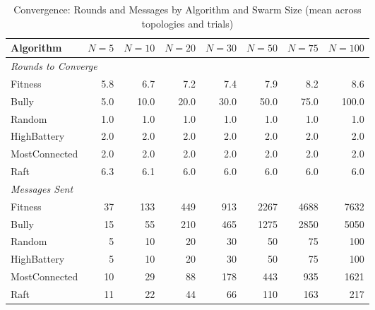 \begin{table}[htbp]
\centering
\caption{Convergence: Rounds and Messages by Algorithm and Swarm Size (mean across topologies and trials)}
\label{tab:convergence}
\begin{tabular}{lrrrrrrr}
\toprule
  Algorithm & $N=5$ & $N=10$ & $N=20$ & $N=30$ & $N=50$ & $N=75$ & $N=100$ \\
\midrule
\multicolumn{8}{l}{\textit{Rounds to Converge}} \\
\midrule
  Fitness & 5.8 & 6.7 & 7.2 & 7.4 & 7.9 & 8.2 & 8.6 \\
  Bully & 5.0 & 10.0 & 20.0 & 30.0 & 50.0 & 75.0 & 100.0 \\
  Random & 1.0 & 1.0 & 1.0 & 1.0 & 1.0 & 1.0 & 1.0 \\
  HighBattery & 2.0 & 2.0 & 2.0 & 2.0 & 2.0 & 2.0 & 2.0 \\
  MostConnected & 2.0 & 2.0 & 2.0 & 2.0 & 2.0 & 2.0 & 2.0 \\
  Raft & 6.3 & 6.1 & 6.0 & 6.0 & 6.0 & 6.0 & 6.0 \\
\midrule
\multicolumn{8}{l}{\textit{Messages Sent}} \\
\midrule
  Fitness & 37 & 133 & 449 & 913 & 2267 & 4688 & 7632 \\
  Bully & 15 & 55 & 210 & 465 & 1275 & 2850 & 5050 \\
  Random & 5 & 10 & 20 & 30 & 50 & 75 & 100 \\
  HighBattery & 5 & 10 & 20 & 30 & 50 & 75 & 100 \\
  MostConnected & 10 & 29 & 88 & 178 & 443 & 935 & 1621 \\
  Raft & 11 & 22 & 44 & 66 & 110 & 163 & 217 \\
\bottomrule
\end{tabular}
\end{table}